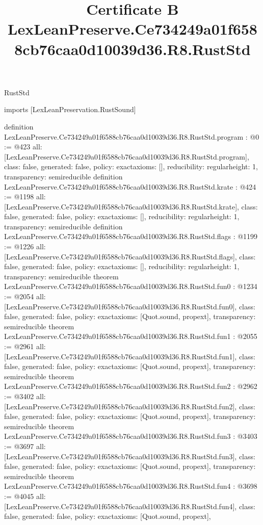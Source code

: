 \begin{lexlean}{RustStd}
\title{Certificate B LexLeanPreserve.Ce734249a01f6588cb76caa0d10039d36.R8.RustStd}
\begin{coremodule}
imports [LexLeanPreservation.RustSound]

definition LexLeanPreserve.Ce734249a01f6588cb76caa0d10039d36.R8.RustStd.program : @0 := @423 {
  all: [LexLeanPreserve.Ce734249a01f6588cb76caa0d10039d36.R8.RustStd.program],
  class: false,
  generated: false,
  policy: exact{axioms: []},
  reducibility: regular{height: 1},
  transparency: semireducible
}
definition LexLeanPreserve.Ce734249a01f6588cb76caa0d10039d36.R8.RustStd.krate : @424 := @1198 {
  all: [LexLeanPreserve.Ce734249a01f6588cb76caa0d10039d36.R8.RustStd.krate],
  class: false,
  generated: false,
  policy: exact{axioms: []},
  reducibility: regular{height: 1},
  transparency: semireducible
}
definition LexLeanPreserve.Ce734249a01f6588cb76caa0d10039d36.R8.RustStd.flags : @1199 := @1226 {
  all: [LexLeanPreserve.Ce734249a01f6588cb76caa0d10039d36.R8.RustStd.flags],
  class: false,
  generated: false,
  policy: exact{axioms: []},
  reducibility: regular{height: 1},
  transparency: semireducible
}
theorem LexLeanPreserve.Ce734249a01f6588cb76caa0d10039d36.R8.RustStd.fun0 : @1234 := @2054 {
  all: [LexLeanPreserve.Ce734249a01f6588cb76caa0d10039d36.R8.RustStd.fun0],
  class: false,
  generated: false,
  policy: exact{axioms: [Quot.sound, propext]},
  transparency: semireducible
}
theorem LexLeanPreserve.Ce734249a01f6588cb76caa0d10039d36.R8.RustStd.fun1 : @2055 := @2961 {
  all: [LexLeanPreserve.Ce734249a01f6588cb76caa0d10039d36.R8.RustStd.fun1],
  class: false,
  generated: false,
  policy: exact{axioms: [Quot.sound, propext]},
  transparency: semireducible
}
theorem LexLeanPreserve.Ce734249a01f6588cb76caa0d10039d36.R8.RustStd.fun2 : @2962 := @3402 {
  all: [LexLeanPreserve.Ce734249a01f6588cb76caa0d10039d36.R8.RustStd.fun2],
  class: false,
  generated: false,
  policy: exact{axioms: [Quot.sound, propext]},
  transparency: semireducible
}
theorem LexLeanPreserve.Ce734249a01f6588cb76caa0d10039d36.R8.RustStd.fun3 : @3403 := @3697 {
  all: [LexLeanPreserve.Ce734249a01f6588cb76caa0d10039d36.R8.RustStd.fun3],
  class: false,
  generated: false,
  policy: exact{axioms: [Quot.sound, propext]},
  transparency: semireducible
}
theorem LexLeanPreserve.Ce734249a01f6588cb76caa0d10039d36.R8.RustStd.fun4 : @3698 := @4045 {
  all: [LexLeanPreserve.Ce734249a01f6588cb76caa0d10039d36.R8.RustStd.fun4],
  class: false,
  generated: false,
  policy: exact{axioms: [Quot.sound, propext]},
}
\end{coremodule}
\end{lexlean}
